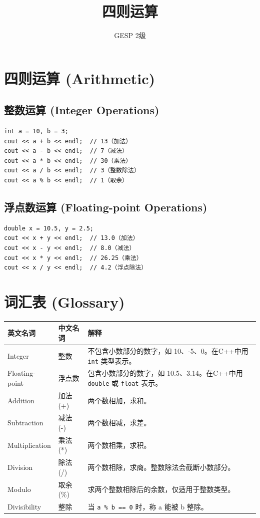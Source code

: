 \documentclass[UTF8,a4paper,12pt]{ctexart}
\title{四则运算}
\author{GESP 2级}
\date{}
\begin{document}
\maketitle

\section*{四则运算 (Arithmetic)}

\subsection*{整数运算 (Integer Operations)}

\begin{lstlisting}
int a = 10, b = 3;
cout << a + b << endl;  // 13（加法）
cout << a - b << endl;  // 7（减法）
cout << a * b << endl;  // 30（乘法）
cout << a / b << endl;  // 3（整数除法）
cout << a % b << endl;  // 1（取余）
\end{lstlisting}

\subsection*{浮点数运算 (Floating-point Operations)}

\begin{lstlisting}
double x = 10.5, y = 2.5;
cout << x + y << endl;  // 13.0（加法）
cout << x - y << endl;  // 8.0（减法）
cout << x * y << endl;  // 26.25（乘法）
cout << x / y << endl;  // 4.2（浮点除法）
\end{lstlisting}

\section*{词汇表 (Glossary)}

\begin{center}
\begin{tabular}{|l|l|p{10cm}|}
\hline
\textbf{英文名词} & \textbf{中文名词} & \textbf{解释} \\
\hline
Integer & 整数 & 不包含小数部分的数字，如 10、-5、0。在C++中用 \texttt{int} 类型表示。 \\
\hline
Floating-point & 浮点数 & 包含小数部分的数字，如 10.5、3.14。在C++中用 \texttt{double} 或 \texttt{float} 表示。 \\
\hline
Addition & 加法 (+) & 两个数相加，求和。 \\
\hline
Subtraction & 减法 (-) & 两个数相减，求差。 \\
\hline
Multiplication & 乘法 (*) & 两个数相乘，求积。 \\
\hline
Division & 除法 (/) & 两个数相除，求商。整数除法会截断小数部分。 \\
\hline
Modulo & 取余 (\%) & 求两个整数相除后的余数，仅适用于整数类型。 \\
\hline
Divisibility & 整除 & 当 \texttt{a \% b == 0} 时，称 a 能被 b 整除。 \\
\hline
\end{tabular}
\end{center}
\end{document}
